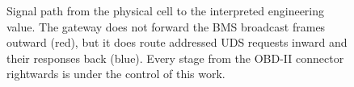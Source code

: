 \begin{figure}[H]
\caption[Signal path from cell to engineering value]{Signal path from the physical cell to the
interpreted engineering value. The gateway does not forward the BMS broadcast frames outward
(red), but it does route addressed UDS requests inward and their responses back (blue). Every
stage from the OBD-II connector rightwards is under the control of this work.}
\label{fig:signal_path}
\end{figure}



